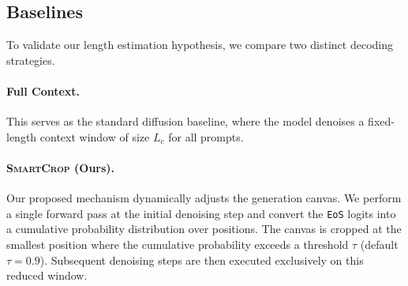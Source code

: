 \documentclass{article}
\theoremstyle{plain}
\theoremstyle{definition}
\theoremstyle{remark}
\begin{document}
\begin{table}[t]
\centering
\caption{\textbf{Experimental Configurations.} Summary of hyper-parameters across benchmark datasets. \textit{Context} ($L_c$) denotes the fixed canvas length (in tokens) utilized during the initial forward pass, inclusive of the prompt tokens. \textit{Steps} ($T$) indicates the total number of denoising iterations. For example, $L_c=256$ with $T=256$ implies a linear schedule where exactly 1 token is unmasked per step (the effective number of tokens to be unmasked is $L_c-L_p$, where $L_p$ is the prompt length). \textit{Content} describes the task domains represented in each dataset.}
\label{tab:benchmarks}
\end{table}

\subsection{Baselines}

To validate our length estimation hypothesis, we compare two distinct decoding strategies.

\paragraph{Full Context.} This serves as the standard diffusion baseline, where the model denoises a fixed-length context window of size $L_c$ for all prompts.

\paragraph{\textsc{SmartCrop} (Ours).} Our proposed mechanism dynamically adjusts the generation canvas. We perform a single forward pass at the initial denoising step and convert the \texttt{EoS} logits into a cumulative probability distribution over positions. The canvas is cropped at the smallest position where the cumulative probability exceeds a threshold $\tau$ (default $\tau = 0.9$). Subsequent denoising steps are then executed exclusively on this reduced window.
\end{document}
